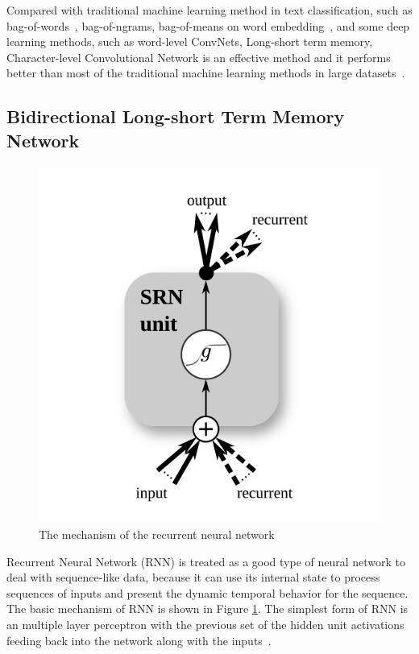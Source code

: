 Compared with traditional machine learning method in text classification, such as bag-of-words~\cite{sparck1972statistical}, bag-of-ngrams, bag-of-means on word embedding~\cite{mikolov2013distributed}, and some deep learning methods, such as word-level ConvNets, Long-short term memory, Character-level Convolutional Network is an effective method and it performs better than most of the traditional machine learning methods in large datasets~\cite{zhang2015character}.

\subsection{Bidirectional Long-short Term Memory Network}
\begin{figure}
\centering
\caption{The mechanism of the recurrent neural network~\cite{Greff2017}}
\label{rnn}
\includegraphics{rnn.png}
\end{figure}
Recurrent Neural Network (RNN) is treated as a good type of neural network to deal with sequence-like data, because it can use its internal state to process sequences of inputs and present the dynamic temporal behavior for the sequence. The basic mechanism of RNN is shown in Figure \ref{rnn}. The simplest form of RNN is an multiple layer perceptron with the previous set of the hidden unit activations feeding back into the network along with the inputs~\cite{bullinaria2013recurrent}. 

